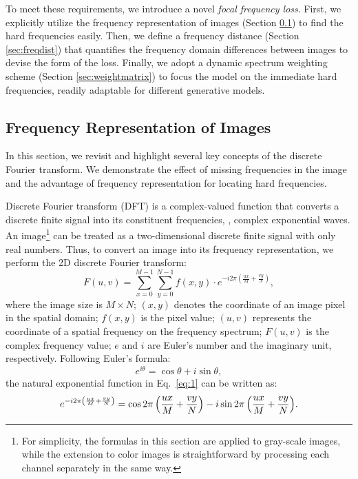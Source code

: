 \documentclass[10pt,twocolumn,letterpaper]{article}
\begin{document}
To meet these requirements, we introduce a novel \textit{focal frequency loss}.
First, we explicitly utilize the frequency representation of images (Section \ref{sec:freqrepre}) to find the hard frequencies easily.
Then, we define a frequency distance (Section \ref{sec:freqdist}) that quantifies the frequency domain differences between images to devise the form of the loss.
Finally, we adopt a dynamic spectrum weighting scheme (Section \ref{sec:weightmatrix}) to focus the model on the immediate hard frequencies, readily adaptable for different generative models.
\fi

\subsection{Frequency Representation of Images}
\label{sec:freqrepre}

In this section, we revisit and highlight several key concepts of the discrete Fourier transform. We demonstrate the effect of missing frequencies in the image and the advantage of frequency representation for locating hard frequencies.


Discrete Fourier transform (DFT) is a complex-valued function that converts a discrete finite signal into its constituent frequencies, \ie, complex exponential waves.
An image\footnote{\hspace{0.07cm}For simplicity, the formulas in this section are applied to gray-scale images, while the extension to color images is straightforward by processing each channel separately in the same way.} can be treated as a two-dimensional discrete finite signal with only real numbers. Thus, to convert an image into its frequency representation, we perform the 2D discrete Fourier transform:
\begin{equation}
\label{eq:1}
    F\left(u,v\right)=\sum_{x=0}^{M-1}{\sum_{y=0}^{N-1}{f\left(x,y\right)\cdot e^{-i2\pi\left(\frac{ux}{M}+\frac{vy}{N}\right)}}},
\end{equation}
where the image size is $M \times N$; $\left(x, y\right)$ denotes the coordinate of an image pixel in the spatial domain; $f\left(x, y\right)$ is the pixel value; $\left(u, v\right)$ represents the coordinate of a spatial frequency on the frequency spectrum;  $F\left(u,v\right)$ is the complex frequency value; $e$ and $i$ are Euler's number and the imaginary unit, respectively.
Following Euler's formula:
\begin{equation}
\label{eq:2}
    e^{i\theta}=\cos{\theta}+i\sin{\theta},
\end{equation}
the natural exponential function in Eq.~\eqref{eq:1} can be written as:
\begin{equation}
\label{eq:3}
\footnotesize
    e^{-i2\pi\left(\frac{ux}{M}+\frac{vy}{N}\right)}
    =\cos{2\pi\left(\frac{ux}{M}+\frac{vy}{N}\right)}
    -i\sin{2\pi\left(\frac{ux}{M}+\frac{vy}{N}\right)}.
\end{equation}
\end{document}

